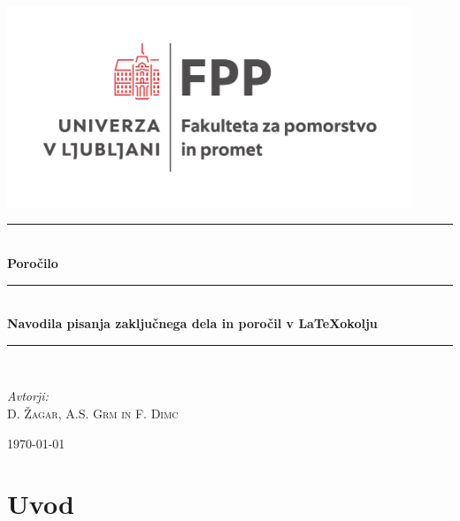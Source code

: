 \documentclass[12pt]{article}
\theoremstyle{definition}
\begin{document}

\thispagestyle{empty}

    \begin{center}
	    \includegraphics[height=6cm]{figs/fpp_logo_uradni.pdf}\\[2.0 cm]
	    
		\rule{\linewidth}{1 mm} \\[7mm]
		{ \huge \bfseries Poročilo}\\[4mm]
		\rule{\linewidth}{1 mm} \\[4mm]
		\doublespacing
		{ \Large \bfseries Navodila pisanja zaključnega dela in poročil v \LaTeX okolju}\\[1mm]
		\singlespacing
		\rule{\linewidth}{1 mm} \\[3cm]
		
		\begin{flushleft} \large
			\emph{Avtorji:}\\[3mm]
			\hspace{1cm}\textsc{D. Žagar, A.S. Grm in F. Dimc}\\[1mm]
		\end{flushleft}
		
		\vfill
		
		{\large \today}\\[1cm]
	\end{center}
	
\newpage
\thispagestyle{plain}

\tableofcontents


\newpage
{}
\setcounter{page}{1}

\newpage
\section{Uvod}
\label{sec:Uvod}
\end{document}
